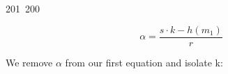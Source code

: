 201~200~\documentclass{article}
\begin{document}
	                                                                        	                                                                    	                                	                    	                    	                        	                        	                    	                                                                	                	                                                                    	                    							                                                                                                                                                                                                    		                                                                                                                        		\[
	                                                                        	                                                                    	                                	                    	                    	                        	                        	                    	                                                                	                	                                                                    	                    							                                                                                                                                                                                                    		                                                                                                                        			\alpha = \frac{s \cdot k - h(m_1)}{r}
	                                                                        	                                                                    	                                	                    	                    	                        	                        	                    	                                                                	                	                                                                    	                    							                                                                                                                                                                                                    		                                                                                                                        			\]

	                                                                        	                                                                    	                                	                    	                    	                        	                        	                    	                                                                	                	                                                                    	                    							                                                                                                                                                                                                    		                                                                                                                        			We remove $\alpha$ from our first equation and isolate k:
\end{document}
